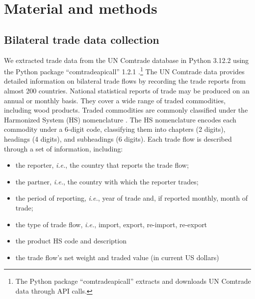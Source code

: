 \documentclass[
  authoryear,
  review,
  3p]{elsarticle}
\providecommand{\tightlist}{%
  \setlength{\itemsep}{0pt}\setlength{\parskip}{0pt}}
\begin{document}
\section{Material and methods}\label{material-and-methods}

\subsection{Bilateral trade data
collection}\label{bilateral-trade-data-collection}

We extracted trade data from the UN Comtrade database in Python 3.12.2
using the Python package ``comtradeapicall'' 1.2.1
\citep{untradestats_comtradeapicall_2024}.\footnote{The Python package
  ``comtradeapicall'' extracts and downloads UN Comtrade data through
  API calls.} The UN Comtrade data provides detailed information on
bilateral trade flows by recording the trade reports from almost 200
countries. National statistical reports of trade may be produced on an
annual or monthly basis. They cover a wide range of traded commodities,
including wood products. Traded commodities are commonly classified
under the Harmonized System (HS) nomenclature
\citep{world_customs_organization_international_1983}. The HS
nomenclature encodes each commodity under a 6-digit code, classifying
them into chapters (2 digits), headings (4 digits), and subheadings (6
digits). Each trade flow is described through a set of information,
including:

\begin{itemize}
\tightlist
\item
  the reporter, \emph{i.e.}, the country that reports the trade flow;
\item
  the partner, \emph{i.e.}, the country with which the reporter trades;
\item
  the period of reporting, \emph{i.e.}, year of trade and, if reported
  monthly, month of trade;
\item
  the type of trade flow, \emph{i.e.}, import, export, re-import,
  re-export
\item
  the product HS code and description
\item
  the trade flow's net weight and traded value (in current US dollars)
\end{itemize}
\end{document}
